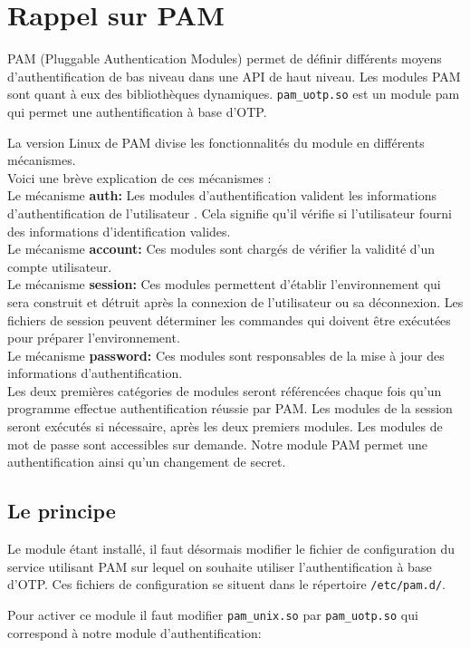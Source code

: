 \documentclass{"../../../res/univ-projet"}
\begin{document}
\section{Rappel sur PAM}
PAM (Pluggable Authentication Modules) permet de définir différents moyens
d'authentification de bas niveau dans une API de haut niveau.
Les modules PAM sont quant à eux des bibliothèques dynamiques. \verb?pam_uotp.so?
est un module pam qui permet une authentification à base d'OTP.

La version Linux de PAM divise les fonctionnalités du module en différents mécanismes.\\
Voici une brève explication de ces mécanismes :\\
Le mécanisme \textbf{auth:} Les modules d'authentification valident les informations d'authentification de l'utilisateur . Cela signifie qu'il vérifie si l'utilisateur fourni des informations d'identification valides.\\
Le mécanisme \textbf{account:} Ces modules sont chargés de vérifier la validité d'un compte utilisateur.\\
Le mécanisme \textbf{session:} Ces modules permettent d'établir l'environnement qui sera construit et détruit après la connexion de l'utilisateur ou sa déconnexion. Les fichiers de session peuvent déterminer les commandes qui doivent être exécutées pour préparer l'environnement.\\
Le mécanisme \textbf{password:} Ces modules sont responsables de la mise à jour des informations d'authentification.\\
Les deux premières catégories de modules seront référencées chaque fois qu'un programme effectue authentification réussie par PAM. 
Les modules de la session seront exécutés si nécessaire, après les deux premiers modules. Les modules de mot de passe sont accessibles sur demande. Notre module PAM permet une authentification ainsi qu'un changement de secret.

\newpage

\subsection{Le principe}
Le module étant installé, il faut désormais modifier le fichier de 
configuration du service utilisant PAM sur lequel on souhaite utiliser 
l'authentification à base d'OTP. Ces fichiers de configuration se situent 
dans le répertoire \verb?/etc/pam.d/?.

Pour activer ce module il faut modifier \verb?pam_unix.so? par \verb?pam_uotp.so?  
qui correspond à notre module d'authentification:
\end{document}
